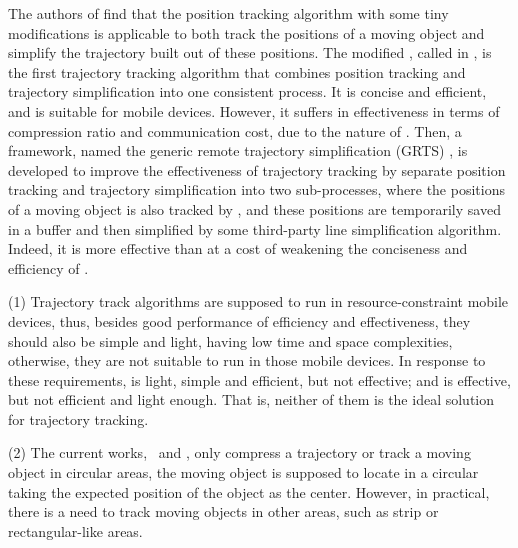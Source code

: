 The authors of \cite{Trajcevski:LDRH} find that the position tracking algorithm \ldr with some tiny modifications is applicable to both track the positions of a moving object and simplify the trajectory built out of these positions. The modified \ldr,  called \ldrh in \cite{Lange:Tracking}, is the first trajectory tracking algorithm that combines position tracking and trajectory simplification into one consistent process. It is concise and efficient, and is suitable for mobile devices. However, it suffers in effectiveness in terms of compression ratio and communication cost, due to the nature of \ldr. 
%
Then, a framework, named the generic remote trajectory simplification (GRTS) \cite{Lange:GRTS,Lange:Tracking}, is developed to improve the effectiveness of trajectory tracking by separate position tracking and trajectory simplification into two sub-processes, where the positions of a moving object is also tracked by \ldr, and these positions are temporarily saved in a buffer and then simplified by some third-party line simplification algorithm. Indeed, it is more effective than \ldrh at a cost of weakening the conciseness and efficiency of \ldrh.
%




\ni(1) Trajectory track algorithms are supposed to run in resource-constraint mobile devices, thus, besides good performance of efficiency and effectiveness, they should also be simple and light, \ie having low time and space complexities, otherwise, they are not suitable to run in those mobile devices. In response to these requirements, \ldrh is light, simple and efficient, but not effective; and \grts is effective, but not efficient and light enough. That is, neither of them is the ideal solution for trajectory tracking.


\ni(2) The current works, \ie~\ldrh and \grts, only compress a trajectory or track a moving object in circular areas, \ie the moving object is supposed to locate in a circular taking the expected position of the object as the center. However, in practical, there is a need to track moving objects in other areas, such as strip or rectangular-like areas. 





